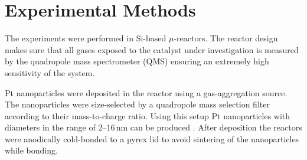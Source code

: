\documentclass[8.5pt,twoside,twocolumn]{article}
\begin{document}
\section{Experimental Methods}
The experiments were performed in Si-based $\mu$-reactors\cite{Henriksen2009}. The reactor design makes sure that all gases exposed to the catalyst under investigation is measured by the quadropole mass spectrometer (QMS) ensuring an extremely high sensitivity of the system. 

Pt nanoparticles were deposited in the reactor using a gas-aggregation source. The nanoparticles were size-selected by a quadropole mass selection filter according to their mass-to-charge ratio. Using this setup Pt nanoparticles with diameters in the range of 2--16\,nm can be produced \cite{Nielsen2009}. After deposition the reactors were anodically cold-bonded \cite{Vesborg2010} to a pyrex lid to avoid sintering of the nanoparticles while bonding.
\end{document}

